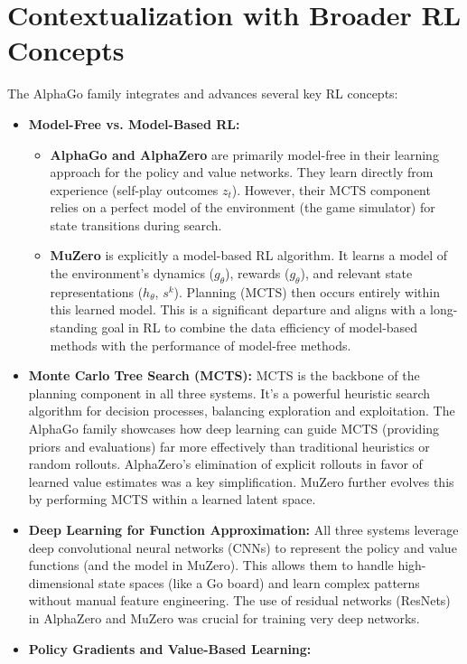 \documentclass[11pt,a4paper]{article}
\begin{document}
\section{Contextualization with Broader RL Concepts}
The AlphaGo family integrates and advances several key RL concepts:
\begin{itemize}
    \item \textbf{Model-Free vs. Model-Based RL:}
        \begin{itemize}
            \item \textbf{AlphaGo and AlphaZero} are primarily model-free in their learning approach for the policy and value networks. They learn directly from experience (self-play outcomes $z_t$). However, their MCTS component relies on a perfect model of the environment (the game simulator) for state transitions during search.
            \item \textbf{MuZero} is explicitly a model-based RL algorithm. It learns a model of the environment's dynamics ($g_{\theta}$), rewards ($g_{\theta}$), and relevant state representations ($h_{\theta}$, $s^k$). Planning (MCTS) then occurs entirely within this learned model. This is a significant departure and aligns with a long-standing goal in RL to combine the data efficiency of model-based methods with the performance of model-free methods.
        \end{itemize}
    \item \textbf{Monte Carlo Tree Search (MCTS):} MCTS is the backbone of the planning component in all three systems. It's a powerful heuristic search algorithm for decision processes, balancing exploration and exploitation. The AlphaGo family showcases how deep learning can guide MCTS (providing priors and evaluations) far more effectively than traditional heuristics or random rollouts. AlphaZero's elimination of explicit rollouts in favor of learned value estimates was a key simplification. MuZero further evolves this by performing MCTS within a learned latent space.
    \item \textbf{Deep Learning for Function Approximation:} All three systems leverage deep convolutional neural networks (CNNs) to represent the policy and value functions (and the model in MuZero). This allows them to handle high-dimensional state spaces (like a Go board) and learn complex patterns without manual feature engineering. The use of residual networks (ResNets) in AlphaZero and MuZero was crucial for training very deep networks.
    \item \textbf{Policy Gradients and Value-Based Learning:}

\end{itemize}
\end{document}
